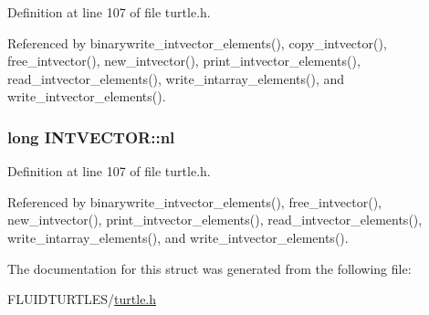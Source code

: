 Definition at line 107 of file turtle.\-h.



Referenced by binarywrite\-\_\-intvector\-\_\-elements(), copy\-\_\-intvector(), free\-\_\-intvector(), new\-\_\-intvector(), print\-\_\-intvector\-\_\-elements(), read\-\_\-intvector\-\_\-elements(), write\-\_\-intarray\-\_\-elements(), and write\-\_\-intvector\-\_\-elements().

\hypertarget{struct_i_n_t_v_e_c_t_o_r_a031c28b900b056db3df8687352e14b18}{
\subsubsection[{nl}]{\setlength{\rightskip}{0pt plus 5cm}long I\-N\-T\-V\-E\-C\-T\-O\-R\-::nl}}\label{struct_i_n_t_v_e_c_t_o_r_a031c28b900b056db3df8687352e14b18}


Definition at line 107 of file turtle.\-h.



Referenced by binarywrite\-\_\-intvector\-\_\-elements(), free\-\_\-intvector(), new\-\_\-intvector(), print\-\_\-intvector\-\_\-elements(), read\-\_\-intvector\-\_\-elements(), write\-\_\-intarray\-\_\-elements(), and write\-\_\-intvector\-\_\-elements().



The documentation for this struct was generated from the following file\-:\begin{DoxyCompactItemize}
\item 
F\-L\-U\-I\-D\-T\-U\-R\-T\-L\-E\-S/\hyperlink{turtle_8h}{turtle.\-h}\end{DoxyCompactItemize}
